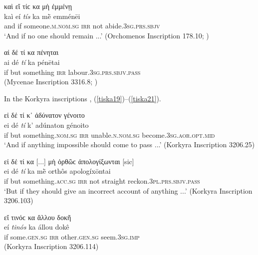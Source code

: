 \begin{exe}
\ex καὶ εἴ τίϲ κα μὴ ἐμμένῃ\\
\gll kaì eí \emph{tís} ka mḕ emménēi\\
and if someone.\textsc{m.nom.sg} \textsc{irr} not abide.\textsc{3sg.prs.sbjv}\\
\trans `And if no one should remain ...' (Orchomenos Inscription 178.10; \citealp[278]{Dittenberger1883})
\label{tiska17}
\end{exe}

\begin{exe}
\ex αἰ δέ τί κα πένηται\\
\gll ai dé \emph{tí} ka pénētai\\
if but something \textsc{irr} labour.\textsc{3sg.prs.sbjv.pass}\\
\trans (Mycenae Inscription 3316.8; \citep[137]{Prellwitz1889})
\label{tiska18}
\end{exe}

In the Korkyra inscriptions \citep[93--98]{Blass1888}, (\ref{tiska19})--(\ref{tiska21}).

\begin{exe}
\ex εἰ δέ τί κ᾽ ἀδύνατον γένοιτο\\
\gll ei dé \emph{tí} k' adúnaton génoito\\
if but something.\textsc{nom.sg} \textsc{irr} unable.\textsc{n.nom.sg}
become.\textsc{3sg.aor.opt.mid}\\
\trans `And if anything impossible should come to pass ...' (Korkyra Inscription 3206.25)
\label{tiska19}
\end{exe}

\begin{exe}
\ex εἰ δέ τί κα {[}...{]} μὴ ὀρθῶϲ ἀπολογίξωνται {[}sic{]}\\
\gll ei dé \emph{tí} ka mḕ orthôs apologíxōntai\\
if but something.\textsc{acc.sg} \textsc{irr} not straight
reckon.\textsc{3pl.prs.sbjv.pass}\\
\trans `But if they should give an incorrect account of anything ...' (Korkyra Inscription 3206.103)
\label{tiska20}
\end{exe}

\begin{exe}
\ex εἴ τινόϲ κα ἄλλου δοκῆ\\
\gll eí \emph{tinós} ka állou dokê\\
if some.\textsc{gen.sg} \textsc{irr} other.\textsc{gen.sg}
seem.\textsc{3sg.imp}\\ 
\trans (Korkyra Inscription 3206.114)
\label{tiska21}
\end{exe}

